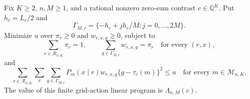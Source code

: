 Fix \(K\geq2\), \(n,M\geq1\), and a rational nonzero zero-sum contrast \(c\in\mathbb Q^K\).  Put \(h_c=L_c/2\) and
\[
 \Gamma_{M,c}=\{-h_c+jh_c/M:j=0,\ldots,2M\}.
\]
Minimize \(u\) over \(\pi_r\geq0\) and \(w_{r,x,g}\geq0\), subject to
\[
 \sum_{r\in\mathcal R_{n,K}}\pi_r=1,
 \qquad
 \sum_{g\in\Gamma_{M,c}}w_{r,x,g}=\pi_r
 \quad\text{for every }(r,x),
\]
and
\[
 \sum_{r\in\mathcal R_{n,K}}\sum_x\sum_{g\in\Gamma_{M,c}}
 P_m(x\mid r)w_{r,x,g}\{g-\tau_c(m)\}^2\leq u
 \quad\text{for every }m\in\mathcal M_{n,K}.
\]
The value of this finite grid-action linear program is \(\Lambda_{n,M}(c)\).